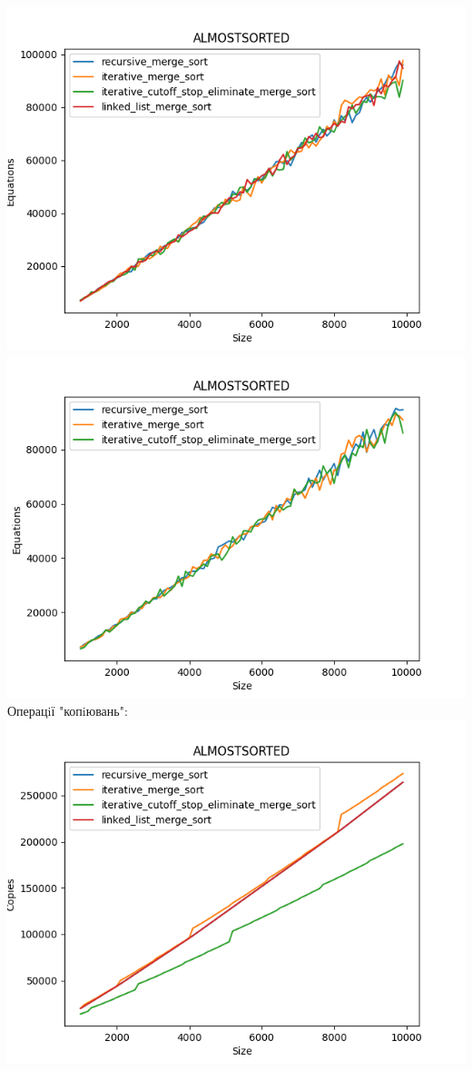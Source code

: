 \documentclass{article}
\begin{document}
            \includegraphics[scale=0.5]{almostsorted_Equations_4_sorts_90_numbers_50.png}
            \includegraphics[scale=0.5]{almostsorted_Equations_3_sorts_90_numbers_50.png}
        \newpage
        Операцiї "копiювань":
        \newline
            \includegraphics[scale=0.5]{almostsorted_Copies_4_sorts_90_numbers_50.png}
\end{document}
